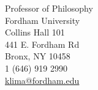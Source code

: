   {Professor of Philosophy 
  \\ Fordham University 
  \\ Collins Hall 101
  \\ 441 E. Fordham Rd
  \\ Bronx, NY 10458
  \\ 1 (646) 919 2990 
  \\ \href{mailto:klima@fordham.edu}{klima@fordham.edu}
}
